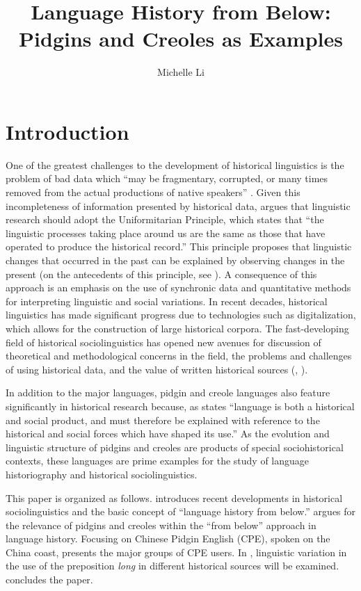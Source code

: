 \documentclass[output=paper]{langsci/langscibook}
\author{Michelle Li\affiliation{Caritas Institute of Higher Education, Hong Kong}\orcid{}}
\title{Language History from Below: Pidgins and Creoles as Examples}
\begin{document}
\maketitle

\section{Introduction} 
One of the greatest challenges to the development of historical linguistics is the problem of bad data which “may be fragmentary, corrupted, or many times removed from the actual productions of native speakers” \citep[100]{labov_principles_1972}. Given this incompleteness of information presented by historical data, \citet[101]{labov_principles_1972} argues that linguistic research should adopt the Uniformitarian Principle, which states that “the linguistic processes taking place around us are the same as those that have operated to produce the historical record.” This principle proposes that linguistic changes that occurred in the past can be explained by observing changes in the present (on the antecedents of this principle, see \citealt{christy_uniformitarianism_1983}). A consequence of this approach is an emphasis on the use of synchronic data and quantitative methods for interpreting linguistic and social variations. In recent decades, historical linguistics has made significant progress due to technologies such as digitalization, which allows for the construction of large historical corpora. The fast-developing field of historical sociolinguistics has opened new avenues for discussion of theoretical and methodological concerns in the field, the problems and challenges of using historical data, and the value of written historical sources (\citealt{hernandez-campoy_handbook_2012}, \citealt{russi_current_2016}). 

In addition to the major languages, pidgin and creole languages also feature significantly in historical research because, as \citet[1696]{romaine_historical_2005} states “language is both a historical and social product, and must therefore be explained with reference to the historical and social forces which have shaped its use.” As the evolution and linguistic structure of pidgins and creoles are products of special sociohistorical contexts, these languages are prime examples for the study of language historiography and historical sociolinguistics. 

This paper is organized as follows.  introduces recent developments in historical sociolinguistics and the basic concept of “language history from below.”  argues for the relevance of pidgins and creoles within the “from below” approach in language history. Focusing on Chinese Pidgin English (CPE), spoken on the China coast,  presents the major groups of CPE users. In , linguistic variation in the use of the preposition \textit{long} in different historical sources will be examined.  concludes the paper.
\end{document}
